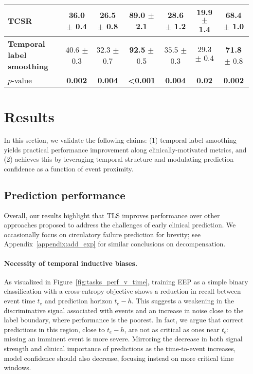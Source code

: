 \documentclass[nohyperref]{article}
\begin{document}
\begin{table*}[t]
{\begin{tabular}{lcccccc}
 TCSR \cite{Maystre2022} &         36.0  $\pm$ 0.4  &	26.5  $\pm$ 0.8  &  89.0 $\pm$ 2.1&  28.6 $\pm$ 1.2 &           19.9 $\pm$ 1.4 & 68.4 $\pm$ 1.0\\
\midrule
\textbf{Temporal label smoothing}     &  $\mathbf{40.6}$ $\pm$ 0.3 &  $\mathbf{32.3}$ $\pm$ 0.7 & \textbf{92.5} $\pm$ 0.5 &$\mathbf{35.5}$ $\pm$ 0.3 &  $\mathbf{29.3}$ $\pm$ 0.4 & \textbf{71.8} $\pm$ 0.8\\
\midrule
{$p$-value}  & \textbf{0.002} & \textbf{0.004}  &  \textbf{<0.001} & \textbf{0.004} & {\textbf{0.02}}  &  \textbf{0.002}\\
\bottomrule
\end{tabular}}
\end{table*}

\section{Results}\label{sec:results}

In this section, we validate the following claims: (1) temporal label smoothing yields practical performance improvement along clinically-motivated metrics, and (2) achieves this by leveraging temporal structure and modulating prediction confidence as a function of event proximity.

\subsection{Prediction performance}\label{sec:perf-results}

Overall, our results highlight that TLS improves performance over other approaches proposed to address the challenges of early clinical prediction. We occasionally focus on circulatory failure prediction for brevity; see Appendix~\ref{appendix:add_exp} for similar conclusions on decompensation.


\paragraph{Necessity of temporal inductive biases.} As visualized in Figure~\ref{fig:tasks_perf_v_time}, training EEP as a simple binary classification with a cross-entropy objective shows a reduction in recall between event time $t_e$ and prediction horizon $t_e - h$. This suggests a weakening in the discriminative signal associated with events and an increase in noise close to the label boundary, where performance is the poorest. In fact, we argue that correct predictions in this region, close to $t_e-h$, are not as critical as ones near $t_e$: missing an imminent event is more severe. Mirroring the decrease in both signal strength and clinical importance of predictions as the time-to-event increases, model confidence should also decrease, focusing instead on more critical time windows.
\end{document}
